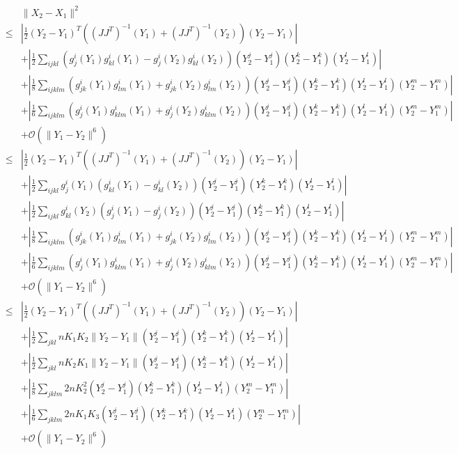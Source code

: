 \documentclass[12pt]{article}
\begin{document}
\begin{eqnarray}
&& \| X_2 - X_1 \|^2 \\
& \le & \left| \frac{1}{2} (Y_2 - Y_1 )^T ((J J^T)^{-1} (Y_1) + (J J^T)^{-1}(Y_2)) (Y_2 - Y_1 ) \right| \\
&& + \left|\frac{1}{2} \sum_{ijkl} \left( g_j^i (Y_1) g^i_{kl} (Y_1) - g_j^i (Y_2) g^i_{kl} (Y_2) \right) (Y^j_2 - Y^j_1 )  (Y^k_2 - Y^k_1)(Y^l_2 - Y^l_1) \right| \\
&& + \left| \frac{1}{8} \sum_{ijklm}  \left( g^i_{jk} (Y_1) g^i_{lm} (Y_1) + g^i_{jk} (Y_2) g^i_{lm} (Y_2)  \right) (Y^j_2 - Y^j_1) (Y^k_2 - Y^k_1) (Y^l_2 - Y^l_1) (Y^m_2 - Y^m_1) \right| \\
&& + \left| \frac{1}{6} \sum_{ijklm}  \left( g^i_{j} (Y_1) g^i_{klm} (Y_1) + g^i_{j} (Y_2) g^i_{klm} (Y_2)  \right)(Y^j_2 - Y^j_1) (Y^k_2 - Y^k_1) (Y^l_2 - Y^l_1) (Y^m_2 - Y^m_1) \right| \\
&& + \mathcal{O} (\|Y_1 - Y_2 \|^6 ) \\
&\le & \left| \frac{1}{2} (Y_2 - Y_1 )^T ((J J^T)^{-1} (Y_1) + (J J^T)^{-1}(Y_2)) (Y_2 - Y_1 ) \right| \\
&& + \left|\frac{1}{2} \sum_{ijkl} g_j^i (Y_1) \left(  g^i_{kl} (Y_1) - g^i_{kl} (Y_2) \right) (Y^j_2 - Y^j_1 )  (Y^k_2 - Y^k_1)(Y^l_2 - Y^l_1) \right| \\
&& + \left|\frac{1}{2} \sum_{ijkl}  g^i_{kl} (Y_2) \left( g_j^i (Y_1) - g_j^i (Y_2) \right) (Y^j_2 - Y^j_1 )  (Y^k_2 - Y^k_1)(Y^l_2 - Y^l_1) \right| \\
&& + \left| \frac{1}{8} \sum_{ijklm}  \left( g^i_{jk} (Y_1) g^i_{lm} (Y_1) + g^i_{jk} (Y_2) g^i_{lm} (Y_2)  \right) (Y^j_2 - Y^j_1) (Y^k_2 - Y^k_1) (Y^l_2 - Y^l_1) (Y^m_2 - Y^m_1) \right| \\
&& + \left| \frac{1}{6} \sum_{ijklm}  \left( g^i_{j} (Y_1) g^i_{klm} (Y_1) + g^i_{j} (Y_2) g^i_{klm} (Y_2)  \right)(Y^j_2 - Y^j_1) (Y^k_2 - Y^k_1) (Y^l_2 - Y^l_1) (Y^m_2 - Y^m_1) \right| \\
&& + \mathcal{O} (\|Y_1 - Y_2 \|^6 ) \\
&\le & \left| \frac{1}{2} (Y_2 - Y_1 )^T ((J J^T)^{-1} (Y_1) + (J J^T)^{-1}(Y_2)) (Y_2 - Y_1 ) \right| \\
&& + \left|\frac{1}{2} \sum_{jkl} n K_1 K_2 \| Y_2 - Y_1 \| (Y^j_2 - Y^j_1 )  (Y^k_2 - Y^k_1)(Y^l_2 - Y^l_1) \right| \\
&& + \left|\frac{1}{2} \sum_{jkl} n K_2 K_1 \| Y_2 - Y_1 \| (Y^j_2 - Y^j_1 )  (Y^k_2 - Y^k_1)(Y^l_2 - Y^l_1) \right| \\
&& + \left| \frac{1}{8} \sum_{jklm}  2 n K_2^2 (Y^j_2 - Y^j_1) (Y^k_2 - Y^k_1) (Y^l_2 - Y^l_1) (Y^m_2 - Y^m_1) \right| \\
&& + \left| \frac{1}{6} \sum_{jklm}  2 n K_1 K_3 (Y^j_2 - Y^j_1) (Y^k_2 - Y^k_1) (Y^l_2 - Y^l_1) (Y^m_2 - Y^m_1) \right| \\
&& + \mathcal{O} (\|Y_1 - Y_2 \|^6 ) 
\end{eqnarray}
\end{document}
